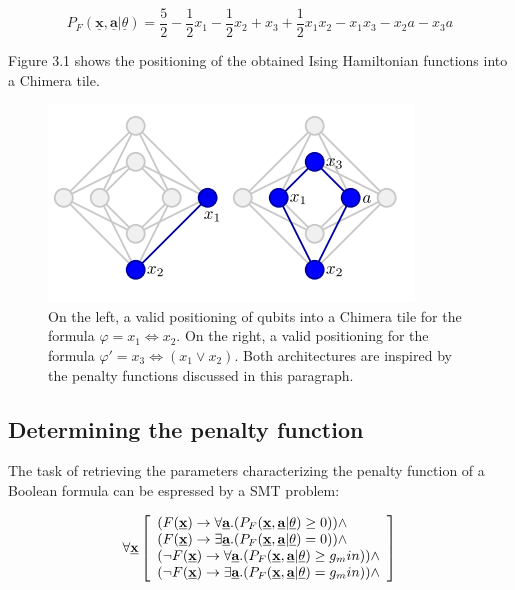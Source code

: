 \begin{equation}
    P_F(\underline{\textbf{x}},\underline{\textbf{a}} | \underline{\theta}) = \frac{5}{2} - \frac{1}{2} x_1 - \frac{1}{2} x_2 + x_3 + \frac{1}{2} x_1x_2 - x_1x_3 - x_2a -x_3a
\end{equation}

Figure 3.1 shows the positioning of the obtained Ising Hamiltonian functions into a Chimera tile.
\begin{figure}[t]
	\begin{center}
	\includegraphics[width=.7\textwidth]{images/Ising1+2.png}
	\caption{On the left, a valid positioning of qubits into a Chimera tile for the formula $\varphi = x_1 \iff x_2$. On the right, a valid positioning for the formula $\varphi ' = x_3 \iff (x_1 \vee x_2)$. Both architectures are inspired by the penalty functions discussed in this paragraph.}
	\end{center}
\end{figure}

\subsection{Determining the penalty function}

The task of retrieving the parameters characterizing the penalty function of a Boolean formula can be espressed by a SMT problem:

\begin{equation}
    \forall \textbf{\underline{x}} \left[
        \begin{array}{lr}
            ( F(\underline{\textbf{x}}) \rightarrow \forall \underline{\textbf{a}}.(P_F(\underline{\textbf{x}},\underline{\textbf{a}} | \underline{\theta}) \geq 0 )) \land \\
            ( F(\underline{\textbf{x}}) \rightarrow \exists \underline{\textbf{a}}.(P_F(\underline{\textbf{x}},\underline{\textbf{a}} | \underline{\theta}) = 0 )) \land \\
            ( \neg F(\underline{\textbf{x}}) \rightarrow \forall \underline{\textbf{a}}.(P_F(\underline{\textbf{x}},\underline{\textbf{a}} | \underline{\theta}) \geq g_min )) \land \\
            ( \neg F(\underline{\textbf{x}}) \rightarrow \exists \underline{\textbf{a}}.(P_F(\underline{\textbf{x}},\underline{\textbf{a}} | \underline{\theta}) = g_min )) \land \\
        \end{array}
    \right]
\end{equation}

